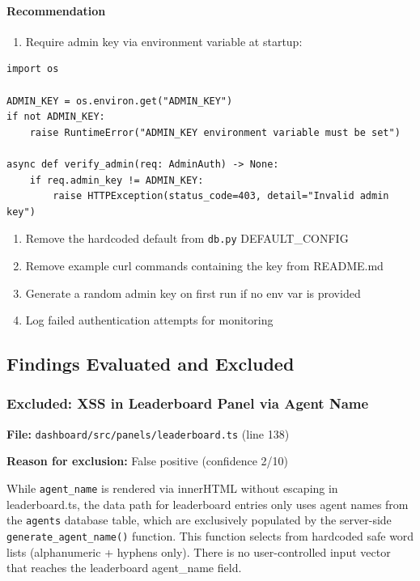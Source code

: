 \documentclass[twocolumn,10pt,letterpaper]{article}
\begin{document}
\paragraph{Recommendation}

\begin{enumerate}
\setlength{\itemsep}{0pt}
\setlength{\parskip}{0pt}
  \item Require admin key via environment variable at startup:
\end{enumerate}

\begin{lstlisting}
import os

ADMIN_KEY = os.environ.get("ADMIN_KEY")
if not ADMIN_KEY:
    raise RuntimeError("ADMIN_KEY environment variable must be set")

async def verify_admin(req: AdminAuth) -> None:
    if req.admin_key != ADMIN_KEY:
        raise HTTPException(status_code=403, detail="Invalid admin key")
\end{lstlisting}

\begin{enumerate}
\setlength{\itemsep}{0pt}
\setlength{\parskip}{0pt}
  \item Remove the hardcoded default from \texttt{db.py} DEFAULT\_CONFIG
  \item Remove example curl commands containing the key from README.md
  \item Generate a random admin key on first run if no env var is provided
  \item Log failed authentication attempts for monitoring
\end{enumerate}

\subsection{Findings Evaluated and Excluded}

\subsubsection{Excluded: XSS in Leaderboard Panel via Agent Name}

\textbf{File:} \texttt{dashboard/\allowbreak src/\allowbreak panels/\allowbreak leaderboard.ts} (line 138)  

\textbf{Reason for exclusion:} False positive (confidence 2/10)


While \texttt{agent\_name} is rendered via innerHTML without escaping in leaderboard.ts, the data path for leaderboard entries only uses agent names from the \texttt{agents} database table, which are exclusively populated by the server-side \texttt{generate\_agent\_name()} function. This function selects from hardcoded safe word lists (alphanumeric + hyphens only). There is no user-controlled input vector that reaches the leaderboard agent\_name field.
\end{document}
